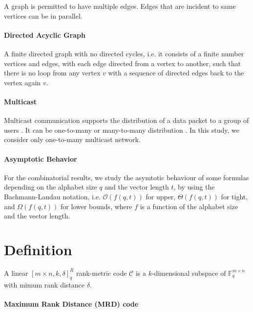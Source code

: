 A graph is permitted to have multiple edges. Edges that are incident
to same vertices can be in parallel. 

\paragraph{Directed Acyclic Graph}

A finite directed graph with no directed cycles, i.e. it consists
of a finite number vertices and edges, with each edge directed from
a vertex to another, such that there is no loop from any vertex $v$
with a sequence of directed edges back to the vertex again $v$.

\paragraph{Multicast}

Multicast communication supports the distribution of a data packet
to a group of users \cite{Zhang:2012}. It can be one-to-many or many-to-many
distribution \cite{Harte:2008}. In this study, we consider only one-to-many
multicast network.

\paragraph{Asymptotic Behavior}

For the combinatorial results, we study the asymtotic behaviour of
some formulas depending on the alphabet size $q$ and the vector length
$t$, by using the Bachmann-Landau notation, i.e. $\mathcal{O}\left(f\left(q,t\right)\right)$
for upper, $\Theta\left(f\left(q,t\right)\right)$ for tight, and
$\Omega\left(f\left(q,t\right)\right)$ for lower bounds, where $f$
is a function of the alphabet size and the vector length.

\section{Definition}
\begin{defn}
 A linear $\left[m\times n,k,\delta\right]_{q}^{R}$ rank-metric
code $\mathcal{C}$ is a $k$-dimensional subspace of $\ensuremath{\mathbb{F}}_{q}^{m\times n}$
with mimum rank distance $\delta$.
\end{defn}

\paragraph{Maximum Rank Distance (MRD) code}

